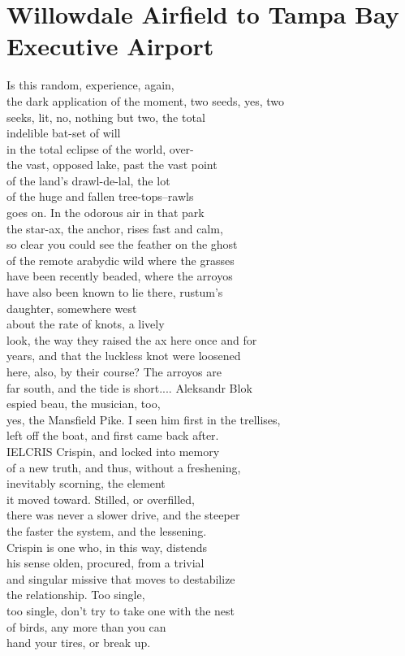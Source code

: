 \documentclass[smalldemyvopaper,11pt,twoside,onecolumn,openright,extrafontsizes]{memoir}
\begin{document}
\chapter{Willowdale Airfield to Tampa Bay Executive Airport}
Is this random, experience, again,
\\the dark application of the moment, two seeds, yes, two
\\seeks, lit, no, nothing but two, the total
\\indelible bat-set of will
\\in the total eclipse of the world, over-
\\the vast, opposed lake, past the vast point
\\of the land's drawl-de-lal, the lot
\\of the huge and fallen tree-tops--rawls
\\goes on. In the odorous air in that park
\\the star-ax, the anchor, rises fast and calm,
\\so clear you could see the feather on the ghost
\\of the remote arabydic wild where the grasses
\\have been recently beaded, where the arroyos
\\have also been known to lie there, rustum's
\\daughter, somewhere west
\\about the rate of knots, a lively
\\look, the way they raised the ax here once and for
\\years, and that the luckless knot were loosened
\\here, also, by their course? The arroyos are
\\far south, and the tide is short.... Aleksandr Blok
\\espied beau, the musician, too,
\\yes, the Mansfield Pike. I seen him first in the trellises,
\\left off the boat, and first came back after.
\\IELCRIS Crispin, and locked into memory
\\of a new truth, and thus, without a freshening,
\\inevitably scorning, the element
\\it moved toward. Stilled, or overfilled,
\\there was never a slower drive, and the steeper
\\the faster the system, and the lessening.
\\Crispin is one who, in this way, distends
\\his sense olden, procured, from a trivial
\\and singular missive that moves to destabilize
\\the relationship. Too single,
\\too single, don't try to take one with the nest
\\of birds, any more than you can
\\hand your tires, or break up.
\end{document}
